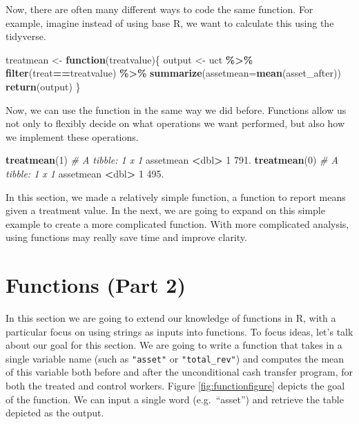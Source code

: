 \documentclass[
]{book}
\newenvironment{Shaded}{\begin{snugshade}}{\end{snugshade}}
\newcommand{\AttributeTok}[1]{\textcolor[rgb]{0.13,0.29,0.53}{#1}}
\newcommand{\CommentTok}[1]{\textcolor[rgb]{0.56,0.35,0.01}{\textit{#1}}}
\newcommand{\ControlFlowTok}[1]{\textcolor[rgb]{0.13,0.29,0.53}{\textbf{#1}}}
\newcommand{\DecValTok}[1]{\textcolor[rgb]{0.00,0.00,0.81}{#1}}
\newcommand{\FloatTok}[1]{\textcolor[rgb]{0.00,0.00,0.81}{#1}}
\newcommand{\FunctionTok}[1]{\textcolor[rgb]{0.13,0.29,0.53}{\textbf{#1}}}
\newcommand{\NormalTok}[1]{#1}
\newcommand{\OtherTok}[1]{\textcolor[rgb]{0.56,0.35,0.01}{#1}}
\newcommand{\SpecialCharTok}[1]{\textcolor[rgb]{0.81,0.36,0.00}{\textbf{#1}}}
\begin{document}
Now, there are often many different ways to code the same function. For example, imagine instead of using base R, we want to calculate this using the tidyverse.

\begin{Shaded}
\begin{Highlighting}[]
\NormalTok{treatmean }\OtherTok{\textless{}{-}} \ControlFlowTok{function}\NormalTok{(treatvalue)\{}
\NormalTok{  output }\OtherTok{\textless{}{-}}\NormalTok{ uct }\SpecialCharTok{\%\textgreater{}\%}
    \FunctionTok{filter}\NormalTok{(treat}\SpecialCharTok{==}\NormalTok{treatvalue) }\SpecialCharTok{\%\textgreater{}\%}
    \FunctionTok{summarize}\NormalTok{(}\AttributeTok{assetmean=}\FunctionTok{mean}\NormalTok{(asset\_after))}
  \FunctionTok{return}\NormalTok{(output)}
\NormalTok{\}}
\end{Highlighting}
\end{Shaded}

Now, we can use the function in the same way we did before. Functions allow us not only to flexibly decide on what operations we want performed, but also how we implement these operations.

\begin{Shaded}
\begin{Highlighting}[]
\FunctionTok{treatmean}\NormalTok{(}\DecValTok{1}\NormalTok{)}
\CommentTok{\# A tibble: 1 x 1}
\NormalTok{  assetmean}
      \SpecialCharTok{\textless{}}\NormalTok{dbl}\SpecialCharTok{\textgreater{}}
\DecValTok{1}      \FloatTok{791.}
\FunctionTok{treatmean}\NormalTok{(}\DecValTok{0}\NormalTok{)}
\CommentTok{\# A tibble: 1 x 1}
\NormalTok{  assetmean}
      \SpecialCharTok{\textless{}}\NormalTok{dbl}\SpecialCharTok{\textgreater{}}
\DecValTok{1}      \FloatTok{495.}
\end{Highlighting}
\end{Shaded}

In this section, we made a relatively simple function, a function to report means given a treatment value. In the next, we are going to expand on this simple example to create a more complicated function. With more complicated analysis, using functions may really save time and improve clarity.

\section{Functions (Part 2)}\label{functions-part-2}

In this section we are going to extend our knowledge of functions in R, with a particular focus on using strings as inputs into functions. To focus ideas, let's talk about our goal for this section. We are going to write a function that takes in a single variable name (such as \texttt{"asset"} or \texttt{"total\_rev"}) and computes the mean of this variable both before and after the unconditional cash transfer program, for both the treated and control workers. Figure \ref{fig:functionfigure} depicts the goal of the function. We can input a single word (e.g.~``asset'') and retrieve the table depicted as the output.
\end{document}

